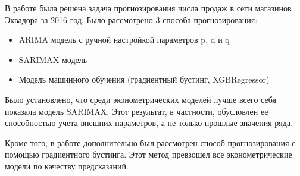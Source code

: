 \documentclass[]{article}
\begin{document}
В работе была решена задача прогнозирования числа продаж в сети магазинов Эквадора за 2016 год. Было рассмотрено 3 способа прогнозирования:
\begin{itemize}
	\item ARIMA модель с ручной настройкой параметров p, d и q
	\item SARIMAX модель
	\item Модель машинного обучения (градиентный бустинг, XGBRegressor)
\end{itemize}

Было установлено, что среди эконометрических моделей лучше всего себя показала модель SARIMAX. Этот результат, в частности, обусловлен ее способностью учета внешних параметров, а не только прошлые значения ряда. 

Кроме того, в работе дополнительно был рассмотрен способ прогнозирования с помощью градиентного бустинга. Этот метод превзошел все эконометрические модели по качеству предсказаний. 
 
	
\end{document}
